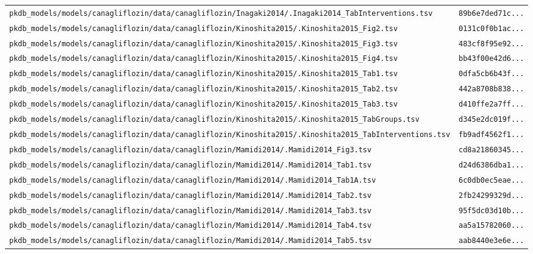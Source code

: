 \documentclass{article}
\begin{document}
\begin{longtable}{ll}
\texttt{pkdb\_models/models/canagliflozin/data/canagliflozin/Inagaki2014/.Inagaki2014\_TabInterventions.tsv} & \texttt{89b6e7ded71c...} \\
\texttt{pkdb\_models/models/canagliflozin/data/canagliflozin/Kinoshita2015/.Kinoshita2015\_Fig2.tsv} & \texttt{0131c0f0b1ac...} \\
\texttt{pkdb\_models/models/canagliflozin/data/canagliflozin/Kinoshita2015/.Kinoshita2015\_Fig3.tsv} & \texttt{483cf8f95e92...} \\
\texttt{pkdb\_models/models/canagliflozin/data/canagliflozin/Kinoshita2015/.Kinoshita2015\_Fig4.tsv} & \texttt{bb43f00e42d6...} \\
\texttt{pkdb\_models/models/canagliflozin/data/canagliflozin/Kinoshita2015/.Kinoshita2015\_Tab1.tsv} & \texttt{0dfa5cb6b43f...} \\
\texttt{pkdb\_models/models/canagliflozin/data/canagliflozin/Kinoshita2015/.Kinoshita2015\_Tab2.tsv} & \texttt{442a8708b838...} \\
\texttt{pkdb\_models/models/canagliflozin/data/canagliflozin/Kinoshita2015/.Kinoshita2015\_Tab3.tsv} & \texttt{d410ffe2a7ff...} \\
\texttt{pkdb\_models/models/canagliflozin/data/canagliflozin/Kinoshita2015/.Kinoshita2015\_TabGroups.tsv} & \texttt{d345e2dc019f...} \\
\texttt{pkdb\_models/models/canagliflozin/data/canagliflozin/Kinoshita2015/.Kinoshita2015\_TabInterventions.tsv} & \texttt{fb9adf4562f1...} \\
\texttt{pkdb\_models/models/canagliflozin/data/canagliflozin/Mamidi2014/.Mamidi2014\_Fig3.tsv} & \texttt{cd8a21860345...} \\
\texttt{pkdb\_models/models/canagliflozin/data/canagliflozin/Mamidi2014/.Mamidi2014\_Tab1.tsv} & \texttt{d24d6386dba1...} \\
\texttt{pkdb\_models/models/canagliflozin/data/canagliflozin/Mamidi2014/.Mamidi2014\_Tab1A.tsv} & \texttt{6c0db0ec5eae...} \\
\texttt{pkdb\_models/models/canagliflozin/data/canagliflozin/Mamidi2014/.Mamidi2014\_Tab2.tsv} & \texttt{2fb24299329d...} \\
\texttt{pkdb\_models/models/canagliflozin/data/canagliflozin/Mamidi2014/.Mamidi2014\_Tab3.tsv} & \texttt{95f5dc03d10b...} \\
\texttt{pkdb\_models/models/canagliflozin/data/canagliflozin/Mamidi2014/.Mamidi2014\_Tab4.tsv} & \texttt{aa5a15782060...} \\
\texttt{pkdb\_models/models/canagliflozin/data/canagliflozin/Mamidi2014/.Mamidi2014\_Tab5.tsv} & \texttt{aab8440e3e6e...} \\

\end{longtable}
\end{document}
